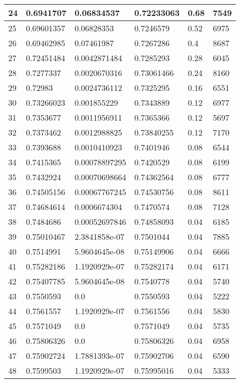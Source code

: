 \begin{longtable}{|l|l|l|l|l|l|}
24 & 0.6941707 & 0.06834537 & 0.72233063 & 0.68 & 7549 \\ \hline 
25 & 0.69601357 & 0.06828353 & 0.7246579 & 0.52 & 6975 \\ \hline 
26 & 0.69462985 & 0.07461987 & 0.7267286 & 0.4 & 8687 \\ \hline 
27 & 0.72451484 & 0.0042871484 & 0.7285293 & 0.28 & 6045 \\ \hline 
28 & 0.7277337 & 0.0020670316 & 0.73061466 & 0.24 & 8160 \\ \hline 
29 & 0.72983 & 0.0024736112 & 0.7325295 & 0.16 & 6551 \\ \hline 
30 & 0.73266023 & 0.001855229 & 0.7343889 & 0.12 & 6977 \\ \hline 
31 & 0.7353677 & 0.0011956911 & 0.7365366 & 0.12 & 5697 \\ \hline 
32 & 0.7373462 & 0.0012988825 & 0.73840255 & 0.12 & 7170 \\ \hline 
33 & 0.7393688 & 0.0010410923 & 0.7401946 & 0.08 & 6544 \\ \hline 
34 & 0.7415365 & 0.00078897295 & 0.7420529 & 0.08 & 6199 \\ \hline 
35 & 0.7432924 & 0.00070698664 & 0.74362564 & 0.08 & 6777 \\ \hline 
36 & 0.74505156 & 0.00067767245 & 0.74530756 & 0.08 & 8611 \\ \hline 
37 & 0.74684614 & 0.0006674304 & 0.7470574 & 0.08 & 7128 \\ \hline 
38 & 0.7484686 & 0.00052697846 & 0.74858093 & 0.04 & 6185 \\ \hline 
39 & 0.75010467 & 2.3841858e-07 & 0.7501044 & 0.04 & 7885 \\ \hline 
40 & 0.7514991 & 5.9604645e-08 & 0.75149906 & 0.04 & 6666 \\ \hline 
41 & 0.75282186 & 1.1920929e-07 & 0.75282174 & 0.04 & 6171 \\ \hline 
42 & 0.75407785 & 5.9604645e-08 & 0.7540778 & 0.04 & 5740 \\ \hline 
43 & 0.7550593 & 0.0 & 0.7550593 & 0.04 & 5222 \\ \hline 
44 & 0.7561557 & 1.1920929e-07 & 0.7561556 & 0.04 & 5830 \\ \hline 
45 & 0.7571049 & 0.0 & 0.7571049 & 0.04 & 5735 \\ \hline 
46 & 0.75806326 & 0.0 & 0.75806326 & 0.04 & 6958 \\ \hline 
47 & 0.75902724 & 1.7881393e-07 & 0.75902706 & 0.04 & 6590 \\ \hline 
48 & 0.7599503 & 1.1920929e-07 & 0.75995016 & 0.04 & 5333 \\ \hline 

\end{longtable}
